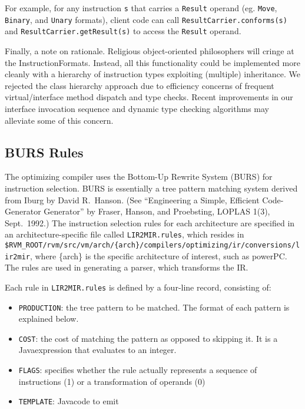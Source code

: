 For example, for any instruction {\tt s} that carries a {\tt Result} operand
(eg. {\tt Move}, {\tt Binary}, and {\tt Unary} formats), client code can call
{\tt ResultCarrier.conforms(s)} and {\tt ResultCarrier.getResult(s)} to access
the {\tt Result} operand.

Finally, a note on rationale.  Religious object-oriented philosophers
will cringe at the InstructionFormats.  Instead, all this
functionality could be implemented more cleanly with a hierarchy of
instruction types exploiting (multiple) inheritance.  We rejected the
class hierarchy approach due to efficiency concerns of frequent
virtual/interface method dispatch and type checks.  Recent
improvements in our interface invocation sequence and dynamic type
checking algorithms may alleviate some of this concern.

\subsection{BURS Rules}\label{burs}

The optimizing compiler uses the Bottom-Up Rewrite System (BURS) for
instruction selection.  BURS is essentially a tree pattern matching
system derived from Iburg by David R.\ Hanson.   (See ``Engineering a
Simple, Efficient Code-Generator Generator'' by Fraser, Hanson, and
Proebsting, LOPLAS 1(3), Sept.\ 1992.)
The instruction selection rules for each architecture are specified in an
architecture-specific file called {\tt LIR2MIR.rules}, which resides in
{\tt \$RVM\_ROOT/rvm/src/vm/arch/\{arch\}/compilers/optimizing/ir/conversions/lir2mir}, where \{arch\} is the
specific architecture of interest, such as powerPC.  The rules are
used in generating a parser, which transforms the IR.

Each rule in {\tt LIR2MIR.rules} is defined by a four-line record,
consisting of:
\begin{itemize}
\item {\tt PRODUCTION}: the tree pattern to be matched.  The format of each
pattern is explained below.
\item {\tt COST}: the cost of matching the pattern as opposed to skipping
it.  It is a Java\trademark expression that evaluates to an integer.
\item {\tt FLAGS}: specifies whether the rule actually represents a sequence
of instructions (1) or a transformation of operands (0)
\item {\tt TEMPLATE}: Java\trademark code to emit
\end{itemize}

